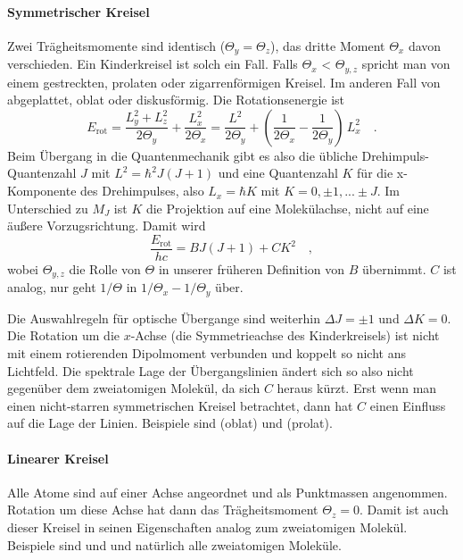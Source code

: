\paragraph{Symmetrischer Kreisel} Zwei Trägheitsmomente sind identisch ($\Theta_y = \Theta_z$), das dritte Moment $\Theta_x$ davon verschieden. Ein Kinderkreisel ist solch ein Fall. Falls $\Theta_x$  < $\Theta_{y,z}$ spricht man von  einem gestreckten, prolaten oder zigarrenförmigen Kreisel. Im anderen Fall von abgeplattet, oblat oder diskusförmig. Die Rotationsenergie ist
\begin{equation}
E_\text{rot} = \frac{L_y^2 + L_z^2}{2 \Theta_y} + \frac{L_x^2}{2 \Theta_x} 
= \frac{L^2 }{2 \Theta_y} + \left( \frac{1}{2 \Theta_x} - \frac{1}{2 \Theta_y} \right) \, L_x^2 \quad .
\end{equation}
Beim Übergang in die Quantenmechanik gibt es also die übliche Drehimpuls-Quantenzahl $J$ mit $L^2 = \hbar^2 J (J+1)$ und eine Quantenzahl $K$ für die x-Komponente des Drehimpulses, also $L_x = \hbar K$ mit $K = 0, \pm 1, ... \pm J$. Im Unterschied zu $M_J$ ist $K$ die Projektion auf eine Molekülachse, nicht auf eine äußere Vorzugsrichtung. Damit wird 
\begin{equation}
\frac{E_\text{rot}}{hc} = B J (J + 1) + C K^2 \quad ,
\end{equation}
wobei $\Theta_{y,z}$ die Rolle von $\Theta$ in unserer früheren Definition von $B$ übernimmt. $C$ ist analog, nur geht $1/\Theta$ in $1/ \Theta_x - 1/ \Theta_y$ über.

Die Auswahlregeln für optische Übergange sind weiterhin $\Delta J = \pm 1$ und $\Delta K = 0$. Die Rotation um die $x$-Achse (die Symmetrieachse des Kinderkreisels) ist nicht mit einem rotierenden Dipolmoment verbunden und koppelt so nicht ans Lichtfeld. Die spektrale Lage der Übergangslinien ändert sich so also nicht gegenüber dem zweiatomigen Molekül, da sich $C$ heraus kürzt. Erst wenn man  einen nicht-starren symmetrischen Kreisel betrachtet, dann hat $C$ einen Einfluss auf die Lage der Linien. Beispiele sind   (oblat) und  (prolat).

\begin{marginfigure}
\end{marginfigure}

\paragraph{Linearer Kreisel} Alle Atome sind auf einer Achse angeordnet und als Punktmassen angenommen. Rotation um diese Achse hat dann das Trägheitsmoment $\Theta_z = 0$. Damit ist auch dieser Kreisel in seinen Eigenschaften analog zum zweiatomigen Molekül. Beispiele sind  und  und natürlich alle zweiatomigen Moleküle.
\begin{marginfigure}
\begin{minipage}{30mm}
\centering


\vspace{3mm}

\end{minipage}
\end{marginfigure}

